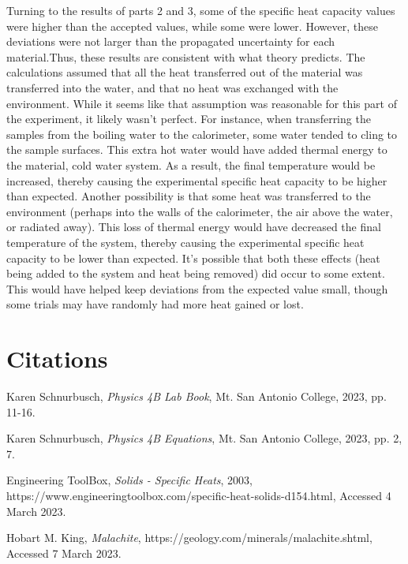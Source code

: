 \documentclass[12pt]{iopart} %
\begin{document}
Turning to the results of parts 2 and 3, some of the specific heat capacity values were higher than the accepted values, while some were lower.
However, these deviations were not larger than the propagated uncertainty for each material.Thus, these results are consistent with what theory predicts.
The calculations assumed that all the heat transferred out of the material was transferred into the water, and that no heat was exchanged with the environment.
While it seems like that assumption was reasonable for this part of the experiment, it likely wasn't perfect.
For instance, when transferring the samples from the boiling water to the calorimeter, some water tended to cling to the sample surfaces.
This extra hot water would have added thermal energy to the material, cold water system.
As a result, the final temperature would be increased, thereby causing the experimental specific heat capacity to be higher than expected.
Another possibility is that some heat was transferred to the environment (perhaps into the walls of the calorimeter, the air above the water, or radiated away).
This loss of thermal energy would have decreased the final temperature of the system, thereby causing the experimental specific heat capacity to be lower than expected.
It's possible that both these effects (heat being added to the system and heat being removed) did occur to some extent.
This would have helped keep deviations from the expected value small, though some trials may have randomly had more heat gained or lost.

\section{Citations}

\begin{thebibliography}{9}

  Karen Schnurbusch,
  \textit{Physics 4B Lab Book},
  Mt. San Antonio College,
  2023,
  pp. 11-16.

  Karen Schnurbusch,
  \textit{Physics 4B Equations},
  Mt. San Antonio College,
  2023,
  pp. 2, 7.

  Engineering ToolBox,
  \textit{Solids - Specific Heats},
  2003,
  https://www.engineeringtoolbox.com/specific-heat-solids-d\textunderscore{}154.html,
  Accessed 4 March 2023.

  Hobart M. King,
  \textit{Malachite},
  https://geology.com/minerals/malachite.shtml,
  Accessed 7 March 2023.

\end{thebibliography}
\end{document}

